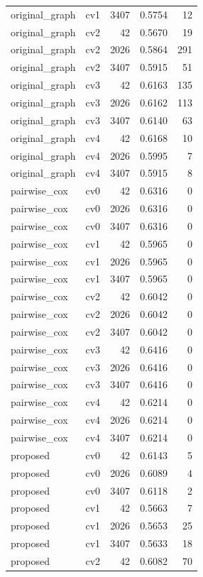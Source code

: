 \documentclass[10pt]{article}
\begin{document}
\begin{longtable}{llrrr}
original\_graph & cv1 & 3407 & 0.5754 & 12\\
original\_graph & cv2 & 42 & 0.5670 & 19\\
original\_graph & cv2 & 2026 & 0.5864 & 291\\
original\_graph & cv2 & 3407 & 0.5915 & 51\\
original\_graph & cv3 & 42 & 0.6163 & 135\\
original\_graph & cv3 & 2026 & 0.6162 & 113\\
original\_graph & cv3 & 3407 & 0.6140 & 63\\
original\_graph & cv4 & 42 & 0.6168 & 10\\
original\_graph & cv4 & 2026 & 0.5995 & 7\\
original\_graph & cv4 & 3407 & 0.5915 & 8\\
pairwise\_cox & cv0 & 42 & 0.6316 & 0\\
pairwise\_cox & cv0 & 2026 & 0.6316 & 0\\
pairwise\_cox & cv0 & 3407 & 0.6316 & 0\\
pairwise\_cox & cv1 & 42 & 0.5965 & 0\\
pairwise\_cox & cv1 & 2026 & 0.5965 & 0\\
pairwise\_cox & cv1 & 3407 & 0.5965 & 0\\
pairwise\_cox & cv2 & 42 & 0.6042 & 0\\
pairwise\_cox & cv2 & 2026 & 0.6042 & 0\\
pairwise\_cox & cv2 & 3407 & 0.6042 & 0\\
pairwise\_cox & cv3 & 42 & 0.6416 & 0\\
pairwise\_cox & cv3 & 2026 & 0.6416 & 0\\
pairwise\_cox & cv3 & 3407 & 0.6416 & 0\\
pairwise\_cox & cv4 & 42 & 0.6214 & 0\\
pairwise\_cox & cv4 & 2026 & 0.6214 & 0\\
pairwise\_cox & cv4 & 3407 & 0.6214 & 0\\
proposed & cv0 & 42 & 0.6143 & 5\\
proposed & cv0 & 2026 & 0.6089 & 4\\
proposed & cv0 & 3407 & 0.6118 & 2\\
proposed & cv1 & 42 & 0.5663 & 7\\
proposed & cv1 & 2026 & 0.5653 & 25\\
proposed & cv1 & 3407 & 0.5633 & 18\\
proposed & cv2 & 42 & 0.6082 & 70\\

\end{longtable}
\end{document}
